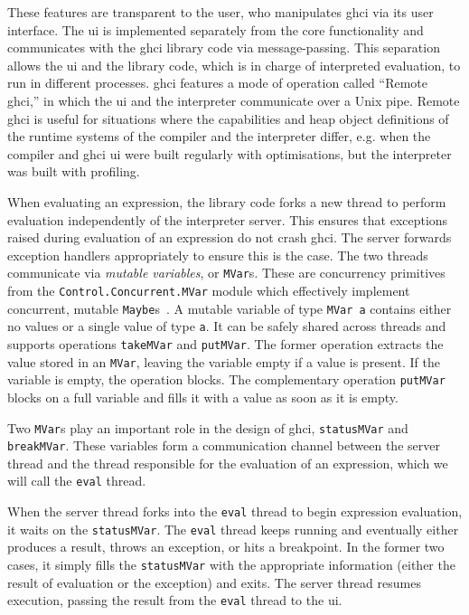 \documentclass[thesis=B,english]{FITthesis}[2019/12/23]
\newcommand{\hsType}[1]{\texttt{#1}}
\newcommand{\hsIdent}[1]{\texttt{#1}}
\newcommand{\hsModule}[1]{\texttt{#1}}
\begin{document}
These features are transparent to the user, who manipulates \acrshort{ghci} via
its user interface. The \acrshort{ui} is implemented separately from the core
functionality and communicates with the \acrshort{ghci} library code via
message-passing. This separation allows the \acrshort{ui} and the library code,
which is in charge of interpreted evaluation, to run in different processes.
\acrshort{ghci} features a mode of operation called ``Remote \acrshort{ghci},''
in which the \acrshort{ui} and the interpreter communicate over a Unix pipe.
Remote \acrshort{ghci} is useful for situations where the capabilities and heap
object definitions of the runtime systems of the compiler and the interpreter
differ, e.g. when the compiler and \acrshort{ghci} \acrshort{ui} were built
regularly with optimisations, but the interpreter was built with profiling.

When evaluating an expression, the library code forks a new thread to perform
evaluation independently of the interpreter server. This ensures that
exceptions raised during evaluation of an expression do not crash
\acrshort{ghci}. The server forwards exception handlers appropriately to ensure
this is the case. The two threads communicate via \textit{mutable variables},
or \hsType{MVar}s. These are concurrency primitives from the
\hsModule{Control.Concurrent.MVar} module which effectively implement
concurrent, mutable \hsType{Maybe}s~\cite{concurrent-haskell}. A mutable
variable of type \hsType{MVar a} contains either no values or a single value of
type \hsType{a}. It can be safely shared across threads and supports
operations \hsIdent{takeMVar} and \hsIdent{putMVar}. The former operation
extracts the value stored in an \hsType{MVar}, leaving the variable empty if a
value is present. If the variable is empty, the operation blocks. The
complementary operation \hsIdent{putMVar} blocks on a full variable and fills
it with a value as soon as it is empty.

Two \hsType{MVar}s play an important role in the design of \acrshort{ghci},
\hsIdent{statusMVar} and \hsIdent{breakMVar}. These variables form a
communication channel between the server thread and the thread responsible for
the evaluation of an expression, which we will call the \texttt{eval} thread.

When the server thread forks into the \texttt{eval} thread to begin expression
evaluation, it waits on the \hsIdent{statusMVar}. The \texttt{eval} thread
keeps running and eventually either produces a result, throws an exception, or
hits a breakpoint. In the former two cases, it simply fills the
\hsIdent{statusMVar} with the appropriate information (either the result of
evaluation or the exception) and exits. The server thread resumes execution,
passing the result from the \texttt{eval} thread to the \acrshort{ui}.
\end{document}

